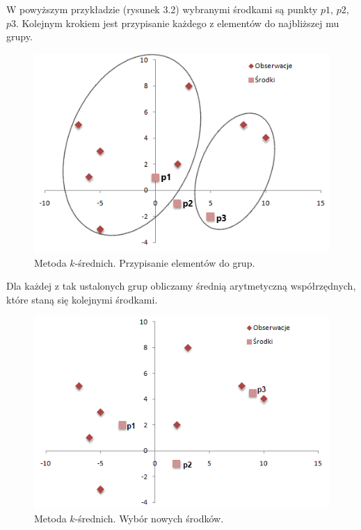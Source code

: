 \documentclass[12pt,a4paper]{report}
\begin{document}
W powyższym przykładzie (rysunek 3.2) wybranymi środkami są punkty $p1$, $p2$, $p3$. Kolejnym krokiem jest przypisanie każdego z elementów do najbliższej mu grupy.
\begin{center}
\begin{figure}[H]
\centering
\includegraphics[scale=0.8]{ks_1.png} 
\caption{Metoda $k$-średnich. Przypisanie elementów do grup.}
\end{figure}
\end{center}
Dla każdej z tak ustalonych grup obliczamy średnią arytmetyczną współrzędnych, które staną się kolejnymi środkami.
\begin{center}
\begin{figure}[H]
\centering
\includegraphics[scale=0.8]{ks_2.png} 
\caption{Metoda $k$-średnich. Wybór nowych środków.}
\end{figure}
\end{center}
\end{document}
